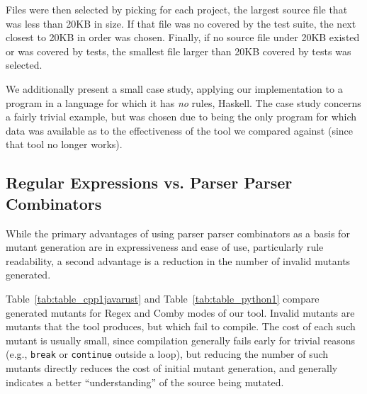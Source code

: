 \documentclass[sigconf,review, anonymous]{acmart}
\begin{document}
{      Files were then selected by picking for each project, the
      largest source file that was less than 20KB in size.  If that
      file was no covered by the test suite, the next closest to 20KB in order
      was chosen.  Finally, if no source file under 20KB existed or
      was covered by tests, the smallest file larger than 20KB covered
      by tests was selected.


We additionally present a small
case study, applying our implementation to a program in a language for
which it has \emph{no} rules, Haskell.  The case study concerns a
fairly trivial example, but was chosen due to being the only program
for which data was available as to the effectiveness of the tool we
compared against (since that tool no longer works).

\subsection{Regular Expressions vs. Parser Parser Combinators}

While the primary advantages of using parser parser combinators as a
basis for mutant generation are in expressiveness and ease of use,
particularly rule readability, a second advantage is a reduction in
the number of invalid mutants generated.

Table~\ref{tab:table_cpp1javarust} and Table~\ref{tab:table_python1} compare generated
mutants for Regex and Comby modes of our tool.  Invalid
mutants are mutants that the tool produces, but which fail to
compile.  The cost of each such mutant is usually small,
since compilation generally fails early for trivial reasons (e.g.,
{\tt break} or {\tt continue} outside a loop), 
but reducing the number of such mutants directly reduces the cost of
initial mutant generation, and generally indicates a better
``understanding'' of the source being mutated.

}
\end{document}
